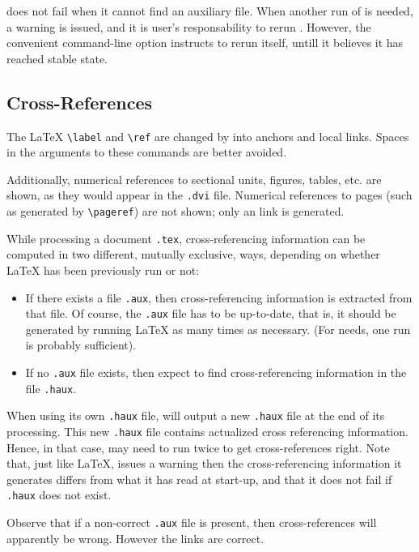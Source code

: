\noindent\hevea{} does not fail when it cannot find an auxiliary file.
When another run of \hevea{} is needed, a warning is issued,
and it is user's responsability to rerun \hevea{}.
However, the convenient  command-line option instructs
\hevea{} to rerun itself, untill it believes it has reached stable state.

\subsection{Cross-References}\label{cross}
The \LaTeX{} \verb+\label+ and \verb+\ref+ are changed by \hevea{}
into {\html} anchors and local links.
Spaces in the arguments to these commands are better avoided.


Additionally, numerical references to sectional units, figures,
tables, etc. are shown, as they would appear in the \texttt{.dvi}
file.
Numerical references to pages (such as generated by \verb+\pageref+)
are not shown; only an link is generated.

While processing a document \texttt{.tex},
cross-referencing information can be computed in two different, mutually
exclusive, ways, depending
on whether \LaTeX{} has been previously run or not:
\begin{itemize}
\item If there exists a file 
\texttt{.aux}, then cross-referencing information is extracted
from that file. Of course, the \texttt{.aux} file
has to be up-to-date, that is,
it should be generated by running \LaTeX{} as many times as necessary.
(For \hevea{} needs, one run is probably sufficient).
\item If no \texttt{.aux} file exists, then \hevea{}
expect to find cross-referencing information in the file
\texttt{.haux}.
\end{itemize}
When using its own \texttt{.haux} file,
\hevea{} will output a
new \texttt{.haux} file at the end of its processing.
This new  \texttt{.haux} file contains actualized
cross referencing information.
Hence, in that case, \hevea{} may need to run twice to get
cross-references right.
Note that, just like \LaTeX,
\hevea{} issues a warning then the cross-referencing information it
generates differs from what it has read at start-up, and that it does
not fail if \texttt{.haux} does not exist.


Observe that if a non-correct \texttt{.aux} file is
present, then cross-references will apparently be wrong. However the
links are correct.


